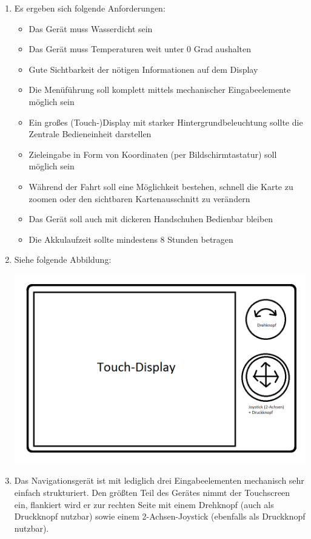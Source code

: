 \documentclass[a4paper,10pt]{article}
\begin{document}
\kopf
\renewcommand{\figurename}{Figure}


\begin{enumerate}
	\item Es ergeben sich folgende Anforderungen: \begin{itemize}
		\item Das Gerät muss Wasserdicht sein
		\item Das Gerät muss Temperaturen weit unter 0 Grad aushalten		
		\item Gute Sichtbarkeit der nötigen Informationen auf dem Display
		\item Die Menüführung soll komplett mittels mechanischer Eingabeelemente möglich sein
		\item Ein großes (Touch-)Display mit starker Hintergrundbeleuchtung sollte die Zentrale Bedieneinheit darstellen
		\item Zieleingabe in Form von Koordinaten (per Bildschirmtastatur) soll möglich sein
		\item Während der Fahrt soll eine Möglichkeit bestehen, schnell die Karte zu zoomen oder den sichtbaren Kartenausschnitt zu verändern
		\item Das Gerät soll auch mit dickeren Handschuhen Bedienbar bleiben 
		\item Die Akkulaufzeit sollte mindestens 8 Stunden betragen
	\end{itemize}
	\item Siehe folgende Abbildung:
		
	\includegraphics[scale=0.6]{Zettel1Aufg1-Steuer.png}
	\item Das Navigationsgerät ist mit lediglich drei Eingabeelementen mechanisch sehr einfach strukturiert. Den größten Teil des Gerätes nimmt der Touchscreen ein, flankiert wird er zur rechten Seite mit einem Drehknopf (auch als Druckknopf nutzbar) sowie einem 2-Achsen-Joystick (ebenfalls als Druckknopf nutzbar).
	

\end{enumerate}
\end{document}
